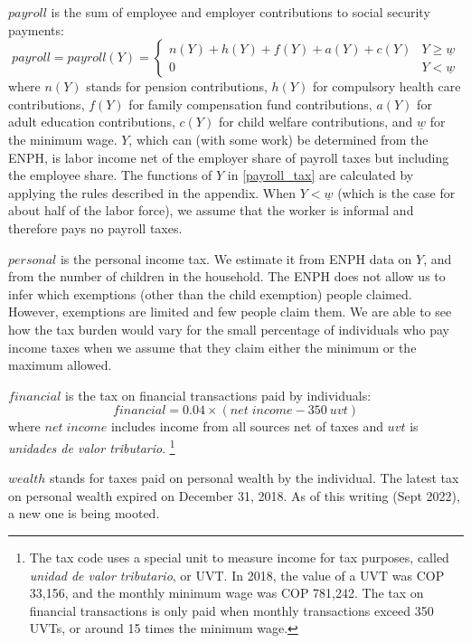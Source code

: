 \documentclass[12pt]{article}
\begin{document}
$payroll$ is the sum of employee and employer contributions to social security payments:
\begin{equation} \label{payroll_tax}
payroll = payroll(Y)=
  \begin{cases}
	n(Y)+h(Y)+f(Y)+a(Y)+c(Y) & Y \geq \underline{w} \\
	0 &  Y < \underline{w}
  \end{cases}
\end{equation}
where  $n(Y)$ stands for pension contributions,
$h(Y)$ for compulsory health care contributions,
$f(Y)$ for family compensation fund contributions,
$a(Y)$ for adult education contributions,
$c(Y)$ for child welfare contributions,
and $\underline{w}$ for the minimum wage.
$Y$, which can (with some work) be determined from the ENPH,
is labor income net of the employer share of payroll taxes
but including the employee share.
The functions of $Y$ in \ref{payroll_tax} are calculated by
applying the rules described in the appendix.
When $Y < \underline{w}$
(which is the case for about half of the labor force),
we assume that the worker is informal and therefore pays no payroll taxes.

$personal$ is the personal income tax.
We estimate it from ENPH data on $Y$,
and from the number of children in the household.
The ENPH does not allow us to infer which exemptions
(other than the child exemption) people claimed.
However, exemptions are limited and few people claim them.
We are able to see how the tax burden would vary
for the small percentage of individuals who pay income taxes
when we assume that they claim either the minimum or the maximum allowed.

$financial$ is the tax on financial transactions paid by individuals:
\begin{equation}
  financial=0.04 \times (net \;income -350\ uvt)
\end{equation}
where $net \;income$ includes income from all sources net of taxes
and $uvt$ is \textit{unidades de valor tributario}.
\footnote{The tax code uses a special unit to measure income for tax purposes,
called \textit{unidad de valor tributario}, or UVT.
In 2018, the value of a UVT was COP 33,156,
and the monthly minimum wage was COP 781,242.
The tax on financial transactions is only paid
when monthly transactions exceed 350 UVTs,
or around 15 times the minimum wage.}

$wealth$ stands for taxes paid on personal wealth by the individual.
The latest tax on personal wealth expired on December 31, 2018.
As of this writing (Sept 2022), a new one is being mooted.
\end{document}
